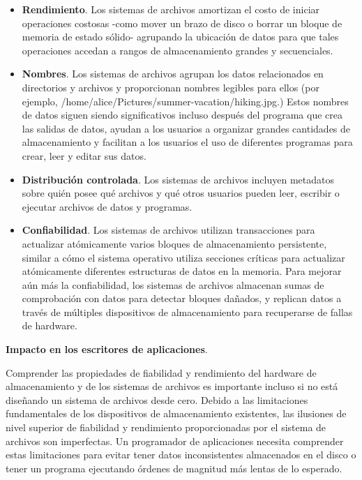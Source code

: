 \documentclass[10pt]{book}
\begin{document}
\begin{itemize}
\item \textbf{Rendimiento}. Los sistemas de archivos amortizan el costo de iniciar operaciones costosas -como mover un brazo de disco o borrar un bloque de memoria de estado sólido- agrupando la ubicación de datos para que tales operaciones accedan a rangos de almacenamiento grandes y secuenciales.

\item \textbf{Nombres}. Los sistemas de archivos agrupan los datos relacionados en directorios y archivos y proporcionan nombres legibles para ellos (por ejemplo, /home/alice/Pictures/summer-vacation/hiking.jpg.) Estos nombres de datos siguen siendo significativos incluso después del programa que crea las salidas de datos, ayudan a los usuarios a organizar grandes cantidades de almacenamiento y facilitan a los usuarios el uso de diferentes programas para crear, leer y editar sus datos.

\item \textbf{Distribución controlada}. Los sistemas de archivos incluyen metadatos sobre quién posee qué archivos y qué otros usuarios pueden leer, escribir o ejecutar archivos de datos y programas.

\item \textbf{Confiabilidad}. Los sistemas de archivos utilizan transacciones para actualizar atómicamente varios bloques de almacenamiento persistente, similar a cómo el sistema operativo utiliza secciones críticas para actualizar atómicamente diferentes estructuras de datos en la memoria. Para mejorar aún más la confiabilidad, los sistemas de archivos almacenan sumas de comprobación con datos para detectar bloques dañados, y replican datos a través de múltiples dispositivos de almacenamiento para recuperarse de fallas de hardware.
\end{itemize}

\textbf{Impacto en los escritores de aplicaciones}.

Comprender las propiedades de fiabilidad y rendimiento del hardware de almacenamiento y de los sistemas de archivos es importante incluso si no está diseñando un sistema de archivos desde cero. Debido a las limitaciones fundamentales de los dispositivos de almacenamiento existentes, las ilusiones de nivel superior de fiabilidad y rendimiento proporcionadas por el sistema de archivos son imperfectas. Un programador de aplicaciones necesita comprender estas limitaciones para evitar tener datos inconsistentes almacenados en el disco o tener un programa ejecutando órdenes de magnitud más lentas de lo esperado.
\end{document}
